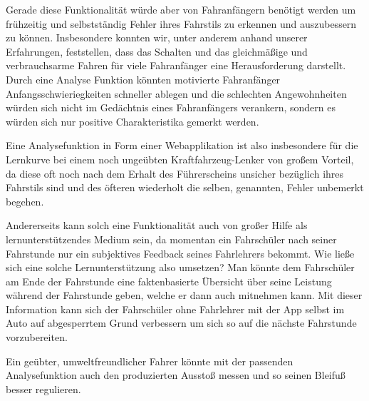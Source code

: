 Gerade diese Funktionalität würde aber von Fahranfängern benötigt werden um frühzeitig und selbstständig Fehler ihres Fahrstils zu erkennen und auszubessern zu können. Insbesondere konnten wir, unter anderem anhand unserer Erfahrungen, feststellen, dass das Schalten und das gleichmäßige und verbrauchsarme Fahren für viele Fahranfänger eine Herausforderung darstellt. Durch eine Analyse Funktion könnten motivierte Fahranfänger Anfangsschwieriegkeiten schneller ablegen und die schlechten Angewohnheiten würden sich nicht im  Gedächtnis eines Fahranfängers verankern, sondern es würden sich nur positive Charakteristika gemerkt werden.  

Eine Analysefunktion in Form einer Webapplikation ist also insbesondere für die Lernkurve bei einem noch ungeübten Kraftfahrzeug-Lenker von großem Vorteil, da diese oft noch nach dem Erhalt des Führerscheins unsicher bezüglich ihres Fahrstils sind und des öfteren wiederholt die selben, genannten, Fehler unbemerkt begehen.

Andererseits kann solch eine Funktionalität auch von großer Hilfe als lernunterstützendes Medium sein, da momentan ein Fahrschüler nach seiner Fahrstunde nur ein subjektives Feedback seines Fahrlehrers bekommt. Wie ließe sich eine solche Lernunterstützung also umsetzen?
Man könnte dem Fahrschüler am Ende der Fahrstunde eine faktenbasierte Übersicht über seine Leistung während der Fahrstunde geben, welche er dann auch mitnehmen kann. Mit dieser Information kann sich der Fahrschüler ohne Fahrlehrer mit der App selbst im Auto auf abgesperrtem Grund verbessern um sich so auf die nächste Fahrstunde vorzubereiten.

Ein geübter, umweltfreundlicher Fahrer könnte mit der passenden Analysefunktion auch den produzierten  Ausstoß messen und so seinen Bleifuß besser regulieren.
\clearpage %
